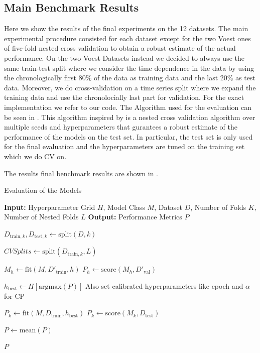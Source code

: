\subsection{Main Benchmark Results}
Here we show the results of the final experiments on the 12 datasets. The main experimental procedure consisted for each dataset except for the two Voest ones of five-fold nested cross validation to obtain a robust estimate of the actual performance. On the two Voest Datasets instead we decided to always use the same train-test split where we consider the time dependence in the data by using the chronologically first 80\% of the data as training data and the last 20\% as test data. Moreover, we do cross-validation on a time series split where we expand the training data and use the chronolocially last part for validation. For the exact implementation we refer to our code. The Algorithm used for the evaluation can be seen in . This algorithm inspired by \cite{rothfuss2019noise} is a nested cross validation algorithm over multiple seeds and hyperparameters that gurantees a robust estimate of the performance of the models on the test set. In particular, the test set is only used for the final evaluation and the hyperparameters are tuned on the training set which we do CV on.

The results final benchmark results are shown in .

\begin{algorithm}
    \caption{Evaluation of the Models}
    \label{alg:evaluation}
    \begin{algorithmic}
        \STATE \textbf{Input:} Hyperparameter Grid $H$, Model Class $M$, Dataset $D$, Number of Folds $K$, Number of Nested Folds $L$
        \STATE \textbf{Output:} Performance Metrics $P$

            \STATE $D_{\text{train}, k}, D_{\text{test}, k} \leftarrow \text{split}(D, k)$
            
            \STATE $CVSplits \leftarrow \text{split}(D_{\text{train}, k}, L)$
            
                    \STATE $M_h \leftarrow \text{fit}(M, D'_{\text{train}}, h)$
                    \STATE $P_h \leftarrow \text{score}(M_h, D'_{\text{val}})$
                \ENDFOR
            \ENDFOR

            \STATE $h_{\text{best}} \leftarrow H[\text{argmax}(P)]$ Also set calibrated hyperparameters like epoch and $\alpha$ for CP

            \STATE $P_k \leftarrow \text{fit}(M, D_{\text{train}}, h_{\text{best}})$
            \STATE $P_k \leftarrow \text{score}(M_k, D_{\text{test}})$    
        \ENDFOR

        \STATE $P \leftarrow \text{mean}(P)$

        \RETURN $P$
    \end{algorithmic}
\end{algorithm}


